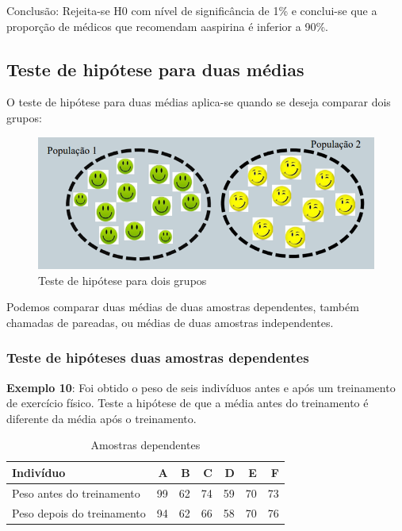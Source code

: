 \documentclass[12pt,portuguese,oneside]{book}
\begin{document}
Conclusão: Rejeita-se H0 com nível de significância de 1\% e conclui-se
que a proporção de médicos que recomendam aaspirina é inferior a 90\%.

\subsection{Teste de hipótese para duas
médias}\label{teste-de-hipotese-para-duas-medias}

O teste de hipótese para duas médias aplica-se quando se deseja comparar
dois grupos:

\begin{figure}[H]

{\centering \includegraphics[width=0.8\linewidth]{testehip2} 

}

\caption{Teste de hipótese para dois grupos}\label{fig:testehip2}
\end{figure}

Podemos comparar duas médias de duas amostras dependentes, também
chamadas de pareadas, ou médias de duas amostras independentes.

\subsubsection{Teste de hipóteses duas amostras
dependentes}\label{teste-de-hipoteses-duas-amostras-dependentes}

\textbf{Exemplo 10}: Foi obtido o peso de seis indivíduos antes e após
um treinamento de exercício físico. Teste a hipótese de que a média
antes do treinamento é diferente da média após o treinamento.

\begin{table}

\caption{\label{tab:unnamed-chunk-109}Amostras dependentes}
\centering
\begin{tabular}[t]{l|r|r|r|r|r|r}
\hline
Indivíduo & A & B & C & D & E & F\\
\hline
Peso antes do treinamento & 99 & 62 & 74 & 59 & 70 & 73\\
\hline
Peso depois do treinamento & 94 & 62 & 66 & 58 & 70 & 76\\
\hline
\end{tabular}
\end{table}
\end{document}
